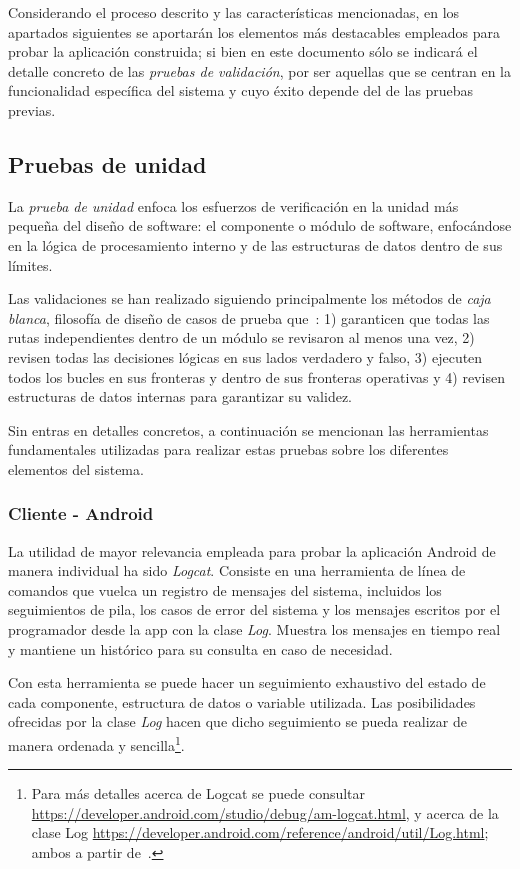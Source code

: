 Considerando el proceso descrito y las características mencionadas, en los apartados siguientes se aportarán los elementos más destacables empleados para probar la aplicación construida; si bien en este documento sólo se indicará el detalle concreto de las \emph{pruebas de validación}, por ser aquellas que se centran en la funcionalidad específica del sistema y cuyo éxito depende del de las pruebas previas.

\subsection{Pruebas de unidad}

La \emph{prueba de unidad} enfoca los esfuerzos de verificación en la unidad más pequeña del diseño de software: el componente o módulo de software, enfocándose en la lógica de procesamiento interno y de las estructuras de datos dentro de sus límites.

Las validaciones se han realizado siguiendo principalmente los métodos de \emph{caja blanca}, filosofía de diseño de casos de prueba que~\cite{Pre10}: 1) garanticen que todas las rutas independientes dentro de un módulo se revisaron al menos una vez, 2) revisen todas las decisiones lógicas en sus lados verdadero y falso, 3) ejecuten todos los bucles en sus fronteras y dentro de sus fronteras operativas y 4) revisen estructuras de datos internas para garantizar su validez.

Sin entras en detalles concretos, a continuación se mencionan las herramientas fundamentales utilizadas para realizar estas pruebas sobre los diferentes elementos del sistema.

\subsubsection{Cliente - Android}

La utilidad de mayor relevancia empleada para probar la aplicación Android de manera individual ha sido \emph{Logcat}. Consiste en una herramienta de línea de comandos que vuelca un registro de mensajes del sistema, incluidos los seguimientos de pila, los casos de error del sistema y los mensajes escritos por el programador desde la app con la clase \emph{Log}. Muestra los mensajes en tiempo real y mantiene un histórico para su consulta en caso de necesidad.

Con esta herramienta se puede hacer un seguimiento exhaustivo del estado de cada componente, estructura de datos o variable utilizada. Las posibilidades ofrecidas por la clase \emph{Log} hacen que dicho seguimiento se pueda realizar de manera ordenada y sencilla\footnote{Para más detalles acerca de Logcat se puede consultar \url{https://developer.android.com/studio/debug/am-logcat.html}, y acerca de la clase Log \url{https://developer.android.com/reference/android/util/Log.html}; ambos a partir de~\cite{AnDev}.}.

